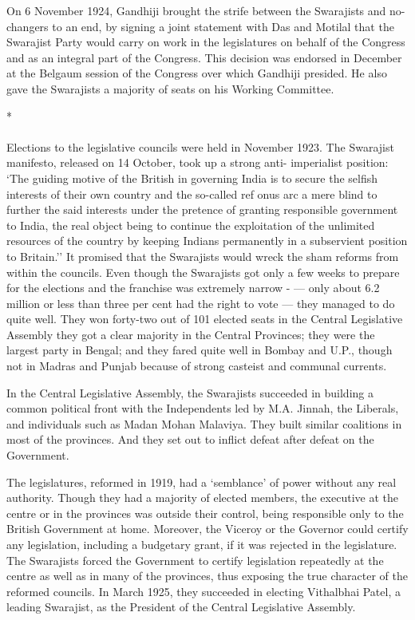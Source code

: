 \begin{multicols}{2}
On 6 November 1924, Gandhiji brought the strife between the Swarajists and no-changers to an end, by signing a joint statement with Das and Motilal that the Swarajist Party would carry on work in the legislatures on behalf of the Congress and as an integral part of the Congress. This decision was endorsed in December at the Belgaum session of the Congress over which Gandhiji presided. He also gave the Swarajists a majority of seats on his Working Committee.

\begin{center}*\end{center}

\paragraph*{}

Elections to the legislative councils were held in November 1923. The Swarajist manifesto, released on 14 October, took up a strong anti- imperialist position: `The guiding motive of the British in governing India is to secure the selfish interests of their own country and the so-called ref onus arc a mere blind to further the said interests under the pretence of granting responsible government to India, the real object being to continue the exploitation of the unlimited resources of the country by keeping Indians permanently in a subservient position to Britain.'' It promised that the Swarajists would wreck the sham reforms from within the councils. Even though the Swarajists got only a few weeks to prepare for the elections and the franchise was extremely narrow - --- only about 6.2 million or less than three per cent had the right to vote --- they managed to do quite well. They won forty-two out of 101 elected seats in the Central Legislative Assembly they got a clear majority in the Central Provinces; they were the largest party in Bengal; and they fared quite well in Bombay and U.P., though not in Madras and Punjab because of strong casteist and communal currents.

In the Central Legislative Assembly, the Swarajists succeeded in building a common political front with the Independents led by M.A. Jinnah, the Liberals, and individuals such as Madan Mohan Malaviya. They built similar coalitions in most of the provinces. And they set out to inflict defeat after defeat on the Government.

The legislatures, reformed in 1919, had a `semblance' of power without any real authority. Though they had a majority of elected members, the executive at the centre or in the provinces was outside their control, being responsible only to the British Government at home. Moreover, the Viceroy or the Governor could certify any legislation, including a budgetary grant, if it was rejected in the legislature. The Swarajists forced the Government to certify legislation repeatedly at the centre as well as in many of the provinces, thus exposing the true character of the reformed councils. In March 1925, they succeeded in electing Vithalbhai Patel, a leading Swarajist, as the President of the Central Legislative Assembly.


\end{multicols}
